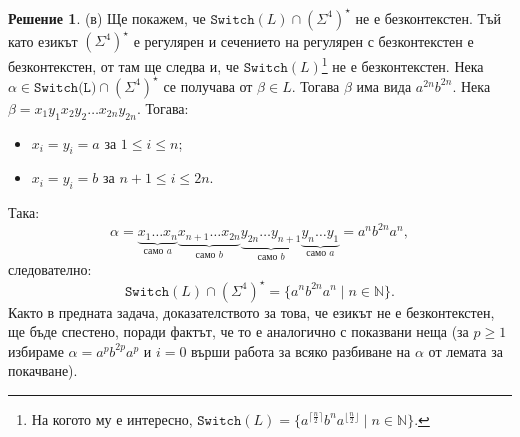 \documentclass[12pt]{article}
\newcommand{\N}{\mathbb{N}}
\theoremstyle{definition}
\newtheorem*{solution}{Решение}
\begin{document}
\begin{solution}
  (в) Ще покажем, че $\texttt{Switch}(L) \cap (\Sigma^4)^\star$ не е безконтекстен.
  Тъй като езикът $(\Sigma^4)^\star$ е регулярен и сечението на регулярен с безконтекстен е безконтекстен, от там ще следва и, че $\texttt{Switch}(L)$\footnote[2]{На когото му е интересно, $\texttt{Switch}(L) = \{ a^{\lceil \frac{n}{2} \rceil} b^n a^{\lfloor \frac{n}{2} \rfloor} \mid n \in \N \}$.} не е безконтекстен.
  Нека $\alpha \in \texttt{Switch(L)} \cap (\Sigma^4)^\star$ се получава от $\beta \in L$.
  Тогава $\beta$ има вида $a^{2n} b^{2n}$.
  Нека $\beta = x_1 y_1 x_2 y_2 \dots x_{2n} y_{2n}$.
  Тогава:
  \begin{itemize}
    \item $x_i = y_i = a$ за $1 \leq i \leq n$;
    \item $x_i = y_i = b$ за $n + 1 \leq i \leq 2n$.
  \end{itemize}
  Така:
  \[
    \alpha = \underbrace{x_1 \dots x_n}_{\text{само } a} \underbrace{x_{n + 1} \dots x_{2n}}_{\text{само } b} \underbrace{y_{2n} \dots y_{n + 1}}_{\text{само } b} \underbrace{y_n \dots y_1}_{\text{само } a} = a^n b^{2n} a^n,
  \]
  следователно:
  \[
    \texttt{Switch}(L) \cap (\Sigma^4)^\star = \{ a^n b^{2n} a^n \mid n \in \N \}.
  \]
  Както в предната задача, доказателството за това, че езикът не е безконтекстен, ще бъде спестено, поради фактът, че то е аналогично с показвани неща (за $p \geq 1$ избираме $\alpha = a^p b^{2p} a^p$ и $i = 0$ върши работа за всяко разбиване на $\alpha$ от лемата за покачване).
\end{solution}
\end{document}
